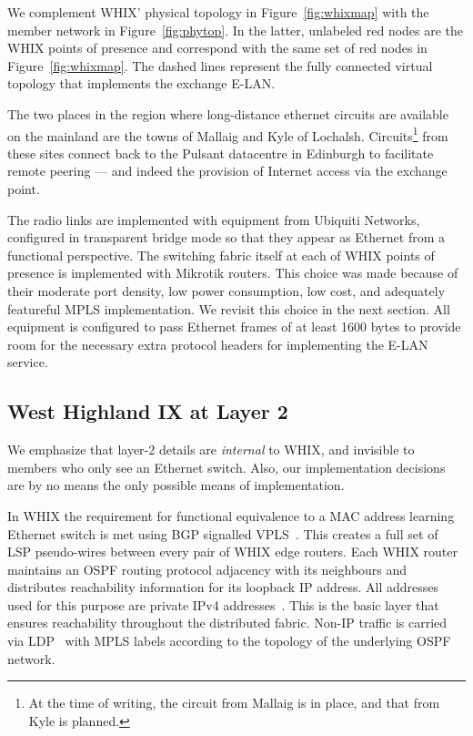 We complement \ac{WHIX}' physical topology in Figure~\ref{fig:whixmap} with
the member network in Figure~\ref{fig:phytop}. In the latter, unlabeled red
nodes are the \ac{WHIX} points of presence and correspond with the same set of
red nodes in Figure~\ref{fig:whixmap}. The dashed lines represent the fully
connected virtual topology that implements the exchange E-LAN.

The two places in the region where long-distance ethernet circuits are
available on the mainland are the towns of Mallaig and Kyle of
Lochalsh. Circuits\footnote{At the time of writing, the circuit from
Mallaig is in place, and that from Kyle is planned.} from these sites
connect back to the Pulsant datacentre in Edinburgh to facilitate
remote peering --- and indeed the provision of Internet access via the
exchange point.

The radio links are implemented with equipment from Ubiquiti Networks,
configured in transparent bridge mode so that they appear as Ethernet from a
functional perspective. The switching fabric itself at each of \ac{WHIX} points
of presence is implemented with Mikrotik routers. This choice was made because
of their moderate port density, low power consumption, low cost, and adequately
featureful \acs{MPLS} implementation. We revisit this choice in the next
section. All equipment is configured to pass Ethernet frames of at least 1600
bytes to provide room for the necessary extra protocol headers for implementing
the E-LAN service.

\subsection{West Highland IX at Layer 2}\label{sec:bgpvpls}

We emphasize that layer-2 details are \emph{internal} to
\ac{WHIX}, and invisible to members who only see an Ethernet switch. Also, our
implementation decisions are by no means the only possible means of
implementation.

In \ac{WHIX} the requirement for functional equivalence to a \acs{MAC} address
learning Ethernet switch is met using \acs{BGP} signalled
\acs{VPLS}~\cite{rfc4761}. This creates a full set of \acs{LSP} pseudo-wires
between every pair of \ac{WHIX} edge routers.
Each \ac{WHIX} router maintains an \acs{OSPF} routing protocol
adjacency with its neighbours and distributes reachability information
for its loopback IP address. All addresses used for this purpose are
private IPv4 addresses~\cite{rfc1918}. This is the basic layer that
ensures reachability throughout the distributed fabric.
Non-IP traffic is carried via \acs{LDP}~\cite{rfc5036}
with \acs{MPLS} labels according to the topology of the underlying \acs{OSPF}
network.

